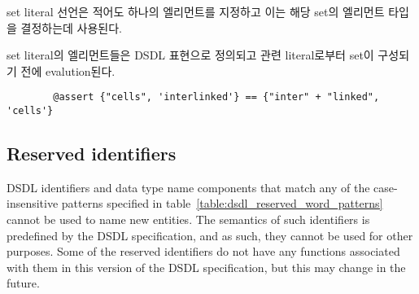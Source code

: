 set literal 선언은 적어도 하나의 엘리먼트를 지정하고 이는 해당 set의 엘리먼트 타입을 결정하는데 사용된다.

set literal의 엘리먼트들은 DSDL 표현으로 정의되고 관련 literal로부터 set이 구성되기 전에 evalution된다.

\begin{remark}
    \begin{verbatim}
        @assert {"cells", 'interlinked'} == {"inter" + "linked", 'cells'}
    \end{verbatim}
\end{remark}

\subsection{Reserved identifiers}\label{sec:dsdl_reserved_identifiers}

DSDL identifiers and data type name components that match any of the
case-insensitive patterns specified in table~\ref{table:dsdl_reserved_word_patterns}
cannot be used to name new entities.
The semantics of such identifiers is predefined by the DSDL specification,
and as such, they cannot be used for other purposes.
Some of the reserved identifiers do not have any functions associated with them
in this version of the DSDL specification, but this may change in the future.

